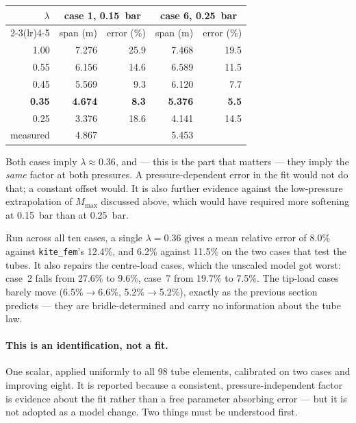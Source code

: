 \documentclass[11pt,a4paper]{article}
\begin{document}
\begin{center}
\begin{tabular}{rrrrr}
\toprule
$\lambda$ & \multicolumn{2}{c}{case 1, \SI{0.15}{bar}} & \multicolumn{2}{c}{case 6, \SI{0.25}{bar}} \\
\cmidrule(lr){2-3}\cmidrule(lr){4-5}
 & span (m) & error (\%) & span (m) & error (\%) \\
\midrule
1.00 & 7.276 & 25.9 & 7.468 & 19.5 \\
0.55 & 6.156 & 14.6 & 6.589 & 11.5 \\
0.45 & 5.569 &  9.3 & 6.120 &  7.7 \\
\textbf{0.35} & \textbf{4.674} & \textbf{8.3} & \textbf{5.376} & \textbf{5.5} \\
0.25 & 3.376 & 18.6 & 4.141 & 14.5 \\
\midrule
\multicolumn{1}{r}{measured} & 4.867 & & 5.453 & \\
\bottomrule
\end{tabular}
\end{center}

\noindent
Both cases imply $\lambda \approx 0.36$, and --- this is the part that matters
--- they imply the \emph{same} factor at both pressures. A pressure-dependent
error in the fit would not do that; a constant offset would. It is also further
evidence against the low-pressure extrapolation of $M_\text{max}$ discussed
above, which would have required more softening at \SI{0.15}{bar} than at
\SI{0.25}{bar}.

Run across all ten cases, a single $\lambda = 0.36$ gives a mean relative error
of 8.0\% against \texttt{kite\_fem}'s 12.4\%, and 6.2\% against 11.5\% on the two
cases that test the tubes. It also repairs the centre-load cases, which the
unscaled model got worst: case~2 falls from 27.6\% to 9.6\%, case~7 from 19.7\%
to 7.5\%. The tip-load cases barely move (6.5\%$\to$6.6\%, 5.2\%$\to$5.2\%),
exactly as the previous section predicts --- they are bridle-determined and
carry no information about the tube law.

\paragraph{This is an identification, not a fit.} One scalar, applied uniformly
to all 98 tube elements, calibrated on two cases and improving eight. It is
reported because a consistent, pressure-independent factor is evidence about the
fit rather than a free parameter absorbing error --- but it is not adopted as a
model change. Two things must be understood first.
\end{document}

